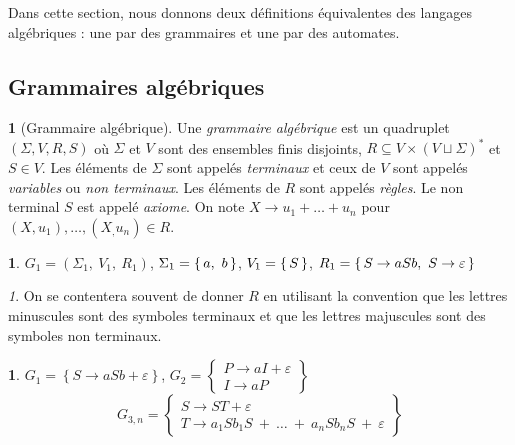 \documentclass[10pt,a4paper,notitlepage]{article}
\theoremstyle{plain}
\theoremstyle{definition}
\newtheorem{defn}[thm]{\protect\definitionname}
\theoremstyle{definition}
\newtheorem{example}[thm]{\protect\examplename}
\theoremstyle{remark}
\theoremstyle{remark}
\newtheorem{rem}[thm]{\protect\remarkname}
\theoremstyle{plain}
\theoremstyle{plain}
\theoremstyle{plain}
\theoremstyle{remark}
\providecommand{\definitionname}{Définition}
\providecommand{\examplename}{Exemple}
\providecommand{\remarkname}{Remarque}
\begin{document}
Dans cette section, nous donnons deux définitions équivalentes des langages algébriques : une par des grammaires et une par des automates.

\subsection{Grammaires algébriques}


\begin{defn}[Grammaire algébrique]
	Une \emph{grammaire algébrique} est un quadruplet $(\Sigma, V, R, S)$ où $\Sigma$ et $V$ sont des ensembles finis disjoints, $R\subseteq V\times(V\sqcup\Sigma)^*$ et $S\in V$. Les éléments de $\Sigma$ sont appelés \emph{terminaux} et ceux de $V$ sont appelés \emph{variables} ou \emph{non terminaux}. Les éléments de $R$ sont appelés \emph{règles}. Le non terminal $S$ est appelé \emph{axiome}. On note $X\to u_1+\dots+u_n$ pour $(X,u_1),\dots,(X_,u_n)\in R$.
\end{defn}

\begin{example}
	$G_{1}=\left(\Sigma_{1},\ V_{1},\ R_{1}\right)$, $\Sigma_{1}=\set{a,\ b}$,
	$V_{1}=\set S$, $R_{1}=\set{S\to aSb,\ S\to\varepsilon}$
\end{example}

\begin{rem}
	On se contentera souvent de donner $R$ en utilisant la convention
	que les lettres minuscules sont des symboles terminaux et que les
	lettres majuscules sont des symboles non terminaux.
\end{rem}

\begin{example}
	$G_{1}=\left\{ S\to aSb+\varepsilon\right\} $, $G_{2}=\left\{ \begin{array}{c}
	P\to aI+\varepsilon\\
	I\to aP
	\end{array}\right\} $
	$$G_{3,n}=\left\{ \begin{array}{c}
	S\to ST+\varepsilon\\
	T\to a_{1}Sb_{1}S\ +\ \dots\ +\ a_{n}Sb_{n}S\ +\ \varepsilon
	\end{array}\right\} $$
\end{example}
\end{document}
